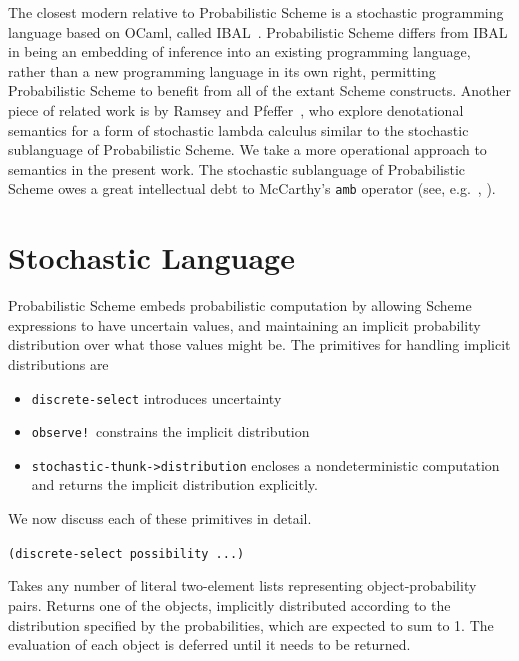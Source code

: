 \documentclass[10pt]{sigplanconf}
\newcommand{\code}[1]{\texttt{#1}}
\newenvironment{documentation}[1]{\vspace{5pt} \noindent \texttt{#1} \nopagebreak \begin{list}{}{\leftmargin 0.7cm}\item}{\end{list}}
\begin{document}
The closest modern relative to Probabilistic Scheme is a stochastic
programming language based on OCaml, called IBAL~\cite{pfeffer01ibal}.
Probabilistic Scheme differs from IBAL in being an embedding of
inference into an existing programming language, rather than a
new programming language in its own right, permitting Probabilistic Scheme
to benefit from all of the extant Scheme constructs.
Another piece of related work is by Ramsey and Pfeffer~\cite{ramsey2002slc},
who explore denotational semantics for a form of stochastic lambda
calculus similar to the stochastic sublanguage of Probabilistic
Scheme.  We take a more operational approach to semantics in the
present work.
The stochastic
sublanguage of Probabilistic Scheme owes a great
intellectual debt to McCarthy's \code{amb} operator (see,
e.g.~\cite{mccarthy1963bmt}, \cite{sicp}).

\section{Stochastic Language}
\label{implicit}

Probabilistic Scheme embeds probabilistic computation by allowing
Scheme expressions to have uncertain values, and maintaining an
implicit probability distribution over what those values might be.
The primitives for handling implicit distributions are
\begin{itemize}
\item \code{discrete-select} introduces uncertainty
\item \code{observe!}\ constrains the implicit distribution
\item \code{stochastic-thunk->distribution} encloses a nondeterministic
computation and returns the implicit distribution explicitly.
\end{itemize}

We now discuss each of these primitives in detail.

\begin{documentation}{(discrete-select possibility ...)}
Takes any number of literal two-element lists representing object-probability
pairs.
Returns one of the objects, implicitly distributed according to the
distribution specified by the probabilities, which are expected to
sum to 1.  The evaluation of each object is deferred until it
needs to be returned.
\end{documentation}
\end{document}
